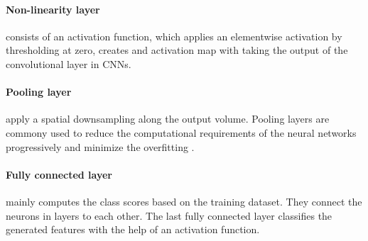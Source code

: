     \paragraph{Non-linearity layer} consists of an activation function, which applies an elementwise activation by thresholding at zero, creates and activation map with taking the output of the convolutional layer in CNNs.

    \paragraph{Pooling layer} apply a spatial downsampling along the output volume.
        Pooling layers are commony used to reduce the computational requirements of the neural networks progressively and minimize the overfitting \cite{Layersof6online}.

    \paragraph{Fully connected layer} mainly computes the class scores based on the training dataset.
        They connect the neurons in layers to each other.
        The last fully connected layer classifies the generated features with the help of an activation function.

